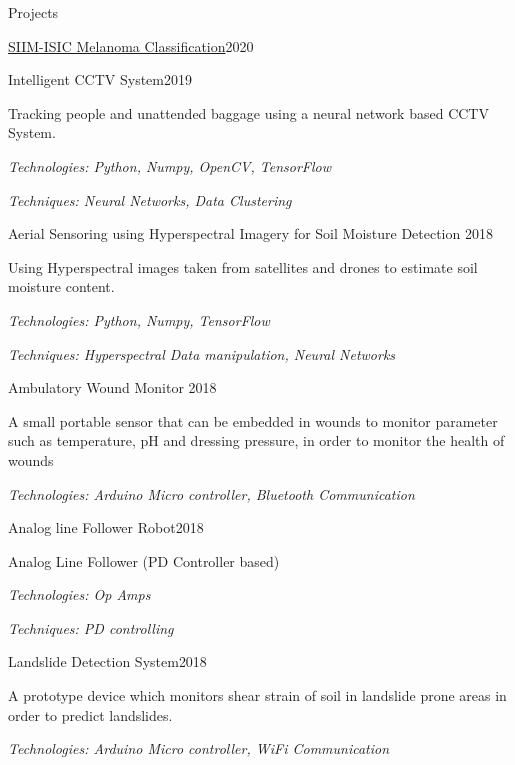 \documentclass{resume} %
\begin{document}
\begin{rSection}{Projects}
\begin{rSubsection}{\href{https://github.com/HeshanDissanayake/SIIM_ISIC_melanoma_classification}{SIIM-ISIC Melanoma Classification}}{2020}{}{}
\begin{rSubsection}{Intelligent CCTV System}{2019}{}{}
\item Tracking people and unattended baggage using a neural network based CCTV System. \item 
\textit{Technologies: Python, Numpy, OpenCV, TensorFlow}
\item \textit{Techniques: Neural Networks, Data Clustering}
\end{rSubsection}

\begin{rSubsection}{Aerial Sensoring using Hyperspectral Imagery for Soil Moisture Detection }{2018}{}{}
\item Using Hyperspectral images taken from satellites and drones to estimate soil moisture content. 
\item \textit{Technologies: Python, Numpy, TensorFlow}
\item \textit{Techniques: Hyperspectral Data manipulation, Neural Networks}
\end{rSubsection}

\begin{rSubsection}{Ambulatory Wound Monitor }{2018}{}{}
\item A small portable sensor that can be embedded in wounds to monitor parameter such as temperature, pH and dressing pressure, in order to monitor the health of wounds
\item \textit{Technologies: Arduino Micro controller, Bluetooth Communication}
\end{rSubsection}


\begin{rSubsection}{Analog line Follower Robot}{2018}{}{}
\item Analog Line Follower (PD Controller based)
\item \textit{Technologies: Op Amps}
\item \textit{Techniques: PD controlling}
\end{rSubsection}

\begin{rSubsection}{Landslide Detection System}{2018}{}{}
\item A prototype device which monitors shear strain of soil in landslide prone areas in order to predict landslides.
\item \textit{Technologies: Arduino Micro controller, WiFi Communication}
\end{rSubsection}


\end{rSubsection}


\end{rSection}
\end{document}
